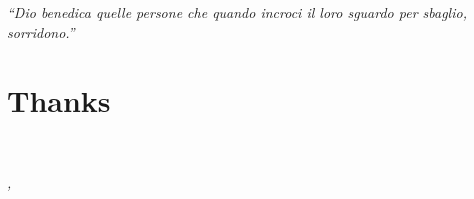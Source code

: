 
\cleardoublepage
{}
{}
\begin{flushright}{
	\slshape
	``Dio benedica quelle persone che quando incroci il loro sguardo per sbaglio, sorridono.''} \\
	\medskip
\end{flushright}


\bigskip

\begingroup

\chapter*{Thanks}

\noindent \textit{}\\

\bigskip

\noindent\textit{\myLocation, \myTime}
\hfill \myName

\endgroup


